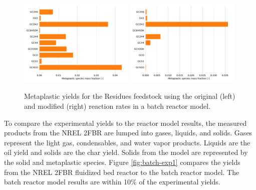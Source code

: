 \begin{figure}[H]
    \centering
    \includegraphics[width=0.49\textwidth]{figures/metaplastic1.pdf}
    \includegraphics[width=0.49\textwidth]{figures/metaplastic2.pdf}
    \caption{Metaplastic yields for the Residues feedstock using the original (left) and modified (right) reaction rates in a batch reactor model.}
    \label{fig:metaplastic}
\end{figure}

To compare the experimental yields to the reactor model results, the measured products from the NREL 2FBR are lumped into gases, liquids, and solids. Gases represent the light gas, condensables, and water vapor products. Liquids are the oil yield and solids are the char yield. Solids from the model are represented by the solid and metaplastic species. Figure \ref{fig:batch-exp1} compares the yields from the NREL 2FBR fluidized bed reactor to the batch reactor model. The batch reactor model results are within 10\% of the experimental yields.


